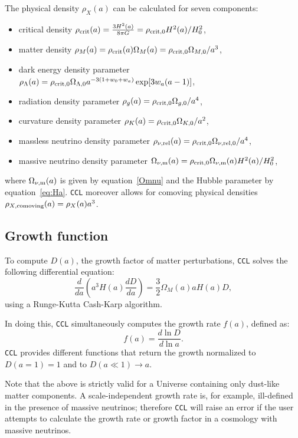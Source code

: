 \documentclass[\docopts]{\docclass}
\newcommand{\ccl}{{\tt CCL}\xspace}
\begin{document}
The physical density $\rho_X(a)$ can be calculated for seven components:
\begin{itemize}
\item critical density $\rho_{\rm crit}(a) = {{3 H^2(a)} \over { 8 \pi G}} = \rho_{\rm crit,0} H^2(a) / H_0^2$,
\item matter density $\rho_M(a) = \rho_{\rm crit}(a) \Omega_M(a) = \rho_{\rm crit,0} \Omega_{M,0} / a^{3}$,
\item dark energy density parameter $\rho_\Lambda(a) = \rho_{\rm crit,0} \Omega_{\Lambda,0} a^{-3(1+w_0+w_a)} \exp[3 w_a (a-1)]$,
\item radiation density parameter $\rho_g(a) = \rho_{\rm crit,0} \Omega_{g,0} / a^{4}$,
\item curvature density parameter $\rho_K(a) = \rho_{\rm crit,0} \Omega_{K,0} / a^{2}$,
\item massless neutrino density parameter $\rho_{\nu, {\rm rel}}(a) = \rho_{\rm crit,0} \Omega_{\nu, {\rm rel},0} / a^{4}$,
\item massive neutrino density parameter $\Omega_{\nu, {\rm m}}(a) = \rho_{\rm crit,0} \Omega_{\nu, {\rm m}}(a) H^2(a) / H_0^2$,
\end{itemize}
where $\Omega_{\nu, {\rm m}}(a)$ is given by equation~\ref{Omnu} and the Hubble
parameter by equation~\ref{eq:Ha}. \ccl moreover allows for comoving physical
densities $\rho_{X, {\rm comoving}}(a) = \rho_X(a) a^3$.


\subsection{Growth function}
\label{sec:growth}

To compute $D(a)$, the growth factor of matter perturbations, \ccl solves the
following differential equation:
\begin{equation}
  \frac{d}{da}\left(a^3H(a)\frac{dD}{da}\right)=\frac{3}{2}\Omega_M(a)aH(a)D,
\end{equation}
using a Runge-Kutta Cash-Karp algorithm.

In doing this, \ccl simultaneously computes the growth rate $f(a)$, defined as:
\begin{equation}
  f(a)=\frac{d\ln D}{d\ln a}.
\end{equation}
\ccl provides different functions that return the growth
normalized to $D(a=1)=1$ and to $D(a\ll1)\rightarrow a$.

Note that the above is strictly valid for a Universe containing only dust-like
matter components. A scale-independent growth rate is, for example, ill-defined
in the presence of massive neutrinos; therefore \ccl will raise an error if the
user attempts to calculate the growth rate or growth factor in a cosmology
with massive neutrinos.
\end{document}
